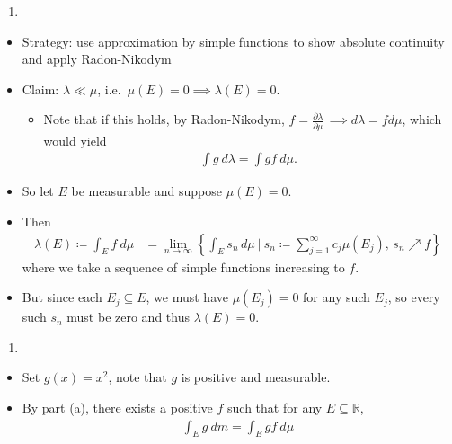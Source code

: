 \begin{solution}

\envlist

\begin{enumerate}
\def\labelenumi{\alph{enumi}.}
\tightlist
\item
\end{enumerate}

\begin{itemize}
\item
  Strategy: use approximation by simple functions to show absolute
  continuity and apply Radon-Nikodym
\item
  Claim: \(\lambda \ll \mu\),
  i.e.~\(\mu(E) = 0 \implies \lambda(E) = 0\).

  \begin{itemize}
  \tightlist
  \item
    Note that if this holds, by Radon-Nikodym,
    \(f = {\frac{\partial \lambda}{\partial \mu}\,} \implies d\lambda = f d\mu\),
    which would yield
    \begin{align*}  
    \int g ~d\lambda = \int g f ~d\mu
    .\end{align*}
  \end{itemize}
\item
  So let \(E\) be measurable and suppose \(\mu(E) = 0\).
\item
  Then
  \begin{align*}
  \lambda(E) \coloneqq\int_E f ~d\mu 
  &= \lim_{n\to\infty} \left\{{\int_E s_n \,d\mu {~\mathrel{\Big|}~}s_n \coloneqq\sum_{j=1}^\infty c_j \mu(E_j),\, s_n \nearrow f}\right\}
  \end{align*}
  where we take a sequence of simple functions increasing to \(f\).
\item
  But since each \(E_j \subseteq E\), we must have \(\mu(E_j) = 0\) for
  any such \(E_j\), so every such \(s_n\) must be zero and thus
  \(\lambda(E) = 0\).
\end{itemize}


\begin{enumerate}
\def\labelenumi{\alph{enumi}.}
\setcounter{enumi}{1}
\tightlist
\item
\end{enumerate}

\begin{itemize}
\item
  Set \(g(x) = x^2\), note that \(g\) is positive and measurable.
\item
  By part (a), there exists a positive \(f\) such that for any
  \(E\subseteq {\mathbb{R}}\),
  \begin{align*}
  \int_E g ~dm = \int_E gf ~d\mu 
  \end{align*}


\end{itemize}
\end{solution}
